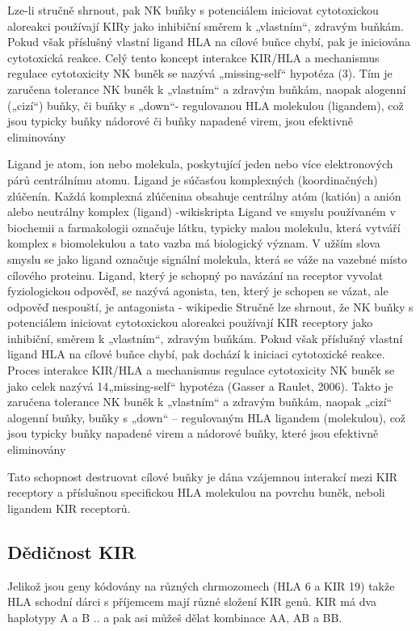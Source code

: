 \documentclass[czech,DP]{thesiskiv}
\begin{document}
Lze-li stručně shrnout, pak NK buňky s potenciálem iniciovat
cytotoxickou aloreakci používají KIRy jako inhibiční směrem k
„vlastním“, zdravým buňkám. Pokud však příslušný vlastní ligand
HLA na cílové buňce chybí, pak je iniciována cytotoxická reakce.
Celý tento koncept interakce KIR/HLA
a mechanismus regulace
cytotoxicity NK buněk se nazývá „missing-self“ hypotéza (3). Tím je
zaručena tolerance NK buněk k „vlastním“ a zdravým buňkám,
naopak alogenní („cizí“) buňky, či buňky s „down“- regulovanou HLA
molekulou (ligandem), což jsou typicky buňky nádorové či buňky
napadené virem, jsou efektivně eliminovány

Ligand je atom, ion nebo molekula, poskytující jeden nebo více elektronových párů centrálnímu atomu. Ligand je súčasťou komplexných (koordinačných) zlúčenín. Každá komplexná zlúčenina obsahuje centrálny atóm (katión) a anión alebo neutrálny komplex (ligand)
-wikiskripta
Ligand ve smyslu používaném v biochemii a farmakologii označuje látku, typicky malou molekulu, která vytváří komplex s biomolekulou a tato vazba má biologický význam. V užším slova smyslu se jako ligand označuje signální molekula, která se váže na vazebné místo cílového proteinu. Ligand, který je schopný po navázání na receptor vyvolat fyziologickou odpověď, se nazývá agonista, ten, který je schopen se vázat, ale odpověď nespouští, je antagonista
- wikipedie
Stručně lze shrnout, že NK buňky s potenciálem iniciovat cytotoxickou aloreakci používají
KIR receptory jako inhibiční, směrem k „vlastním“, zdravým buňkám. Pokud však příslušný
vlastní ligand HLA na cílové buňce chybí, pak dochází k iniciaci cytotoxické reakce. Proces
interakce KIR/HLA a mechanismus regulace cytotoxicity NK buněk se jako celek nazývá
14„missing-self“ hypotéza (Gasser a Raulet, 2006). Takto je zaručena tolerance NK buněk k
„vlastním“ a zdravým buňkám, naopak „cizí“ alogenní buňky, buňky s „down“ –
regulovaným
HLA ligandem (molekulou), což jsou typicky buňky napadené virem a
nádorové buňky, které jsou efektivně eliminovány

 Tato schopnost destruovat cílové buňky je dána
vzájemnou interakcí mezi KIR receptory a příslušnou specifickou
HLA molekulou na povrchu buněk, neboli ligandem KIR receptorů.

\subsection{Dědičnost KIR}
Jelikož jsou geny kódovány na různých chrmozomech (HLA 6 a KIR 19) takže HLA schodní dárci s příjemcem mají různé složení KIR genů.
KIR má dva haplotypy A a B .. a pak asi můžeš dělat kombinace AA, AB a BB.
\end{document}
